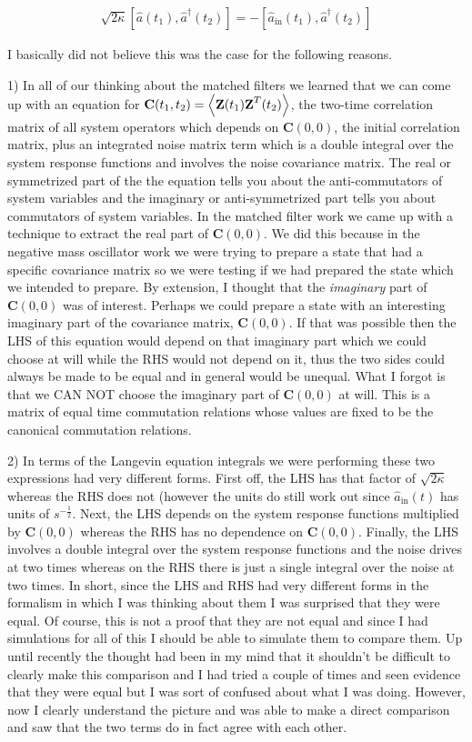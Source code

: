 \documentclass[12pt]{article}
\newcommand{\bv}[1]{\textbf{#1}}
\begin{document}
\begin{align}
\sqrt{2\kappa}[\hat{a}(t_1),\hat{a}^{\dag}(t_2)] = -[\hat{a}_{\text{in}}(t_1),\hat{a}^{\dag}(t_2)]
\end{align}

I basically did not believe this was the case for the following reasons.

1) In all of our thinking about the matched filters we learned that we can come up with an equation for $\bv{C}(t_1,t_2) = \Braket{\bv{Z}(t_1)\bv{Z}^T(t_2)}$, the two-time correlation matrix of all system operators which depends on $\bv{C}(0,0)$, the initial correlation matrix, plus an integrated noise matrix term which is a double integral over the system response functions and involves the noise covariance matrix. The real or symmetrized part of the the equation tells you about the anti-commutators of system variables and the imaginary  or anti-symmetrized part tells you about commutators of system variables. In the matched filter work we came up with a technique to extract the real part of $\bv{C}(0,0)$. We did this because in the negative mass oscillator work we were trying to prepare a state that had a specific covariance matrix so we were testing if we had prepared the state which we intended to prepare. By extension, I thought that the \textit{imaginary} part of $\bv{C}(0,0)$ was of interest. Perhaps we could prepare a state with an interesting imaginary part of the covariance matrix, $\bv{C}(0,0)$. If that was possible then the LHS of this equation would depend on that imaginary part which we could choose at will while the RHS would not depend on it, thus the two sides could always be made to be equal and in general would be unequal. What I forgot is that we CAN NOT choose the imaginary part of $\bv{C}(0,0)$ at will. This is a matrix of equal time commutation relations whose values are fixed to be the canonical commutation relations.

2) In terms of the Langevin equation integrals we were performing these two expressions had very different forms. First off, the LHS has that factor of $\sqrt{2\kappa}$ whereas the RHS does not (however the units do still work out since $\hat{a}_{\text{in}}(t)$ has units of $s^{-\frac{1}{2}}$. Next, the LHS depends on the system response functions multiplied by $\bv{C}(0,0)$ whereas the RHS has no dependence on $\bv{C}(0,0)$. Finally, the LHS involves a double integral over the system response functions and the noise drives at two times whereas on the RHS there is just a single integral over the noise at two times. In short, since the LHS and RHS had very different forms in the formalism in which I was thinking about them I was surprised that they were equal. Of course, this is not a proof that they are not equal and since I had simulations for all of this I should be able to simulate them to compare them. Up until recently the thought had been in my mind that it shouldn't be difficult to clearly make this comparison and I had tried a couple of times and seen evidence that they were equal but I was sort of confused about what I was doing. However, now I clearly understand the picture and was able to make a direct comparison and saw that the two terms do in fact agree with each other.
\end{document}
